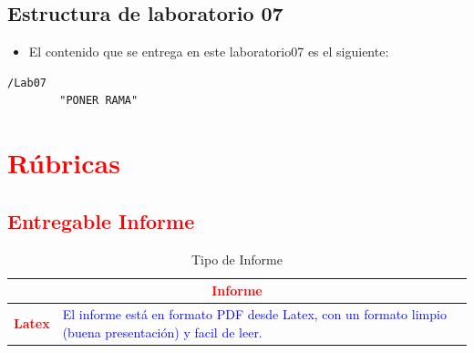 \documentclass{article}
\begin{document}
	\subsection{Estructura de laboratorio 07}
	\begin{itemize}	
		\item El contenido que se entrega en este laboratorio07 es el siguiente:
	\end{itemize}
	\begin{lstlisting}[style=ascii-tree]
	/Lab07	
		"PONER RAMA"
	\end{lstlisting}    
	\section{\textcolor{red}{Rúbricas}}
	
	\subsection{\textcolor{red}{Entregable Informe}}
	\begin{table}[H]
		\caption{Tipo de Informe}
		\setlength{\tabcolsep}{0.5em} %
		{\renewcommand{\arraystretch}{1.5}%
		\begin{tabular}{|p{3cm}|p{12cm}|}
			\hline
			\multicolumn{2}{|c|}{\textbf{\textcolor{red}{Informe}}}  \\
			\hline 
			\textbf{\textcolor{red}{Latex}} & \textcolor{blue}{El informe está en formato PDF desde Latex,  con un formato limpio (buena presentación) y facil de leer.}   \\ 
			\hline 
			
			
		\end{tabular}
	}
	\end{table}
	
	\clearpage
	
\end{document}
